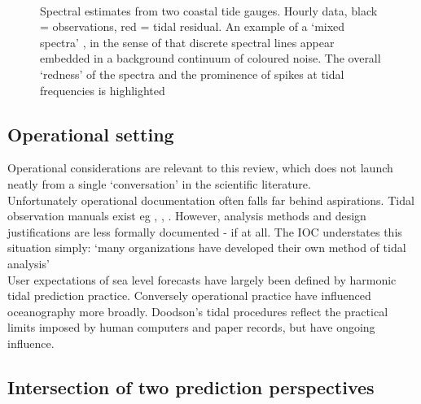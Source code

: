 \begin{figure}[!h]
	\centering
	 \\
	\caption{Spectral estimates from two coastal tide gauges. Hourly data, black = observations, red = tidal residual. An example of a `mixed spectra' \citep{Percival:1998tw}, in the sense of that discrete spectral lines appear embedded in a background continuum of coloured noise.  The overall `redness' of the spectra and the prominence of spikes at tidal frequencies is highlighted }
    \label{fig:SPECTRA_EG}
\end{figure}


\subsection{Operational setting}
\label{S:operational_setting}

Operational considerations are relevant to this review, which does not launch neatly from a single `conversation' \citep{Booth:2009vy} in the scientific literature.\\
Unfortunately operational documentation often falls far behind aspirations.
Tidal observation manuals exist eg \citep{IOC:2005tj}, \citep{Level:2011wu}, \citep{Parker:2007wq}.  However, analysis methods and design justifications are less formally documented - if at all.  The IOC understates this situation simply: `many organizations have developed their own method of tidal analysis'\citep{IOC:2005tj}\\

User expectations of sea level forecasts have largely been defined by harmonic tidal prediction practice. 
Conversely operational practice have influenced oceanography more broadly. Doodson's \citep{Doodson:1928wf} tidal procedures reflect the practical limits imposed by human computers and paper records, but have ongoing influence. \\

\subsection{Intersection of two prediction perspectives}
\label{S:two_perspectives}

